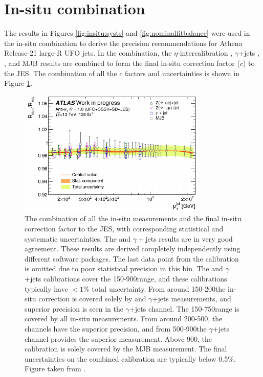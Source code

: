 \section{In-situ combination}

The results in Figures \ref{fig:insitu:systs} and \ref{fig:nominalfitbalance} were used in the in-situ combination \cite{Insitu:combination} to derive the precision recommendations for Athena Release-21 large-R UFO jets. In the combination, the $\eta$-intercalibration \cite{Insitu:etainterufo}, $\gamma$+jets \cite{Insitu:gamjetufo}, \zjets \cite{Insitu:zjetufo}, and MJB results \cite{Insitu:mjbufo} are combined to form the final in-situ correction factor ($c$) to the JES. The combination of all the $c$ factors and uncertainties is shown in Figure \ref{fig:insitu:combination}. 

\begin{figure}[t]
    \centering
    \includegraphics[width=0.8\textwidth]{plots/insitu/combinationplot.pdf}
    \caption{The combination of all the in-situ measurements and the final in-situ correction factor to the JES, with corresponding statistical and systematic uncertainties. The \zjets and $\gamma+$jets results are in very good agreement. These results are derived completely independently using different software packages. The last data point from the \zmmjets calibration is omitted due to poor statistical precision in this bin. The \zjets and $\gamma$+jets calibrations cover the 150-900\GeV range, and these calibrations typically have $<1\%$ total uncertainty. From around 150-200\GeV the in-situ correction is covered solely by \zjets and $\gamma$+jets measurements, and superior precision is seen in the $\gamma$+jets channel. The 150-750\GeV range is covered by all in-situ measurements. From around 200-500\GeV, the \zjets channels have the superior precision, and from 500-900\GeV the $\gamma$+jets channel provides the superior measurement. Above 900\GeV, the calibration is solely covered by the MJB measurement. The final uncertainties on the combined calibration are typically below 0.5\%. Figure taken from \cite{Insitu:combination}.\label{fig:insitu:combination}}
\end{figure}

